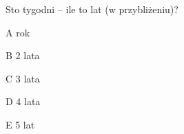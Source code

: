 \begin{tresc}
Sto tygodni – ile to lat (w przybliżeniu)?
\end{tresc}
\begin{wariant}{A} rok \end{wariant}
\begin{wariant}{B} 2 lata \end{wariant}
\begin{wariant}{C} 3 lata \end{wariant}
\begin{wariant}{D} 4 lata \end{wariant}
\begin{wariant}{E} 5 lat \end{wariant}
